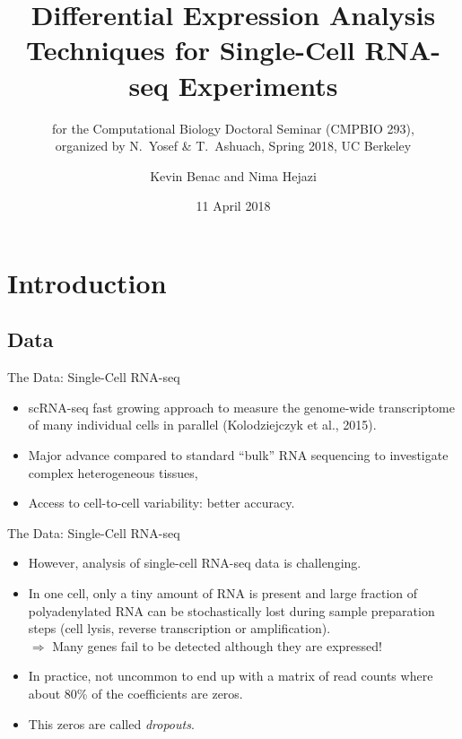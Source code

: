 \documentclass{beamer}
\title[zinbwave-droplasso]{Differential Expression Analysis Techniques for
  Single-Cell RNA-seq Experiments}
\subtitle{\vspace*{0.5em} \scriptsize for the Computational Biology Doctoral
  Seminar (CMPBIO 293),\\ organized by N.~Yosef \& T.~Ashuach, Spring 2018, UC
  Berkeley}
\author{Kevin Benac and Nima Hejazi}
\institute{Group in Biostatistics,\\ University of California, Berkeley}
\date{11 April 2018}
\begin{document}
\begin{frame}
  \titlepage
\end{frame}

\section{Introduction}
\subsection{Data}

\begin{frame}{The Data: Single-Cell RNA-seq}
\begin{itemize}
  \itemsep10pt
  \item scRNA-seq fast growing approach to measure the genome-wide transcriptome
    of many individual cells in parallel (Kolodziejczyk et al., 2015).
  \item Major advance compared to standard “bulk” RNA sequencing to investigate
    complex heterogeneous tissues,
  \item Access to cell-to-cell variability: better accuracy.
\end{itemize}

\end{frame}


\begin{frame}{The Data: Single-Cell RNA-seq}

\begin{itemize}
  \itemsep10pt
  \item However, analysis of single-cell RNA-seq data is challenging.
  \item In one cell, only a tiny amount of RNA is present and large fraction of
    polyadenylated RNA can be stochastically lost during sample preparation
    steps (cell lysis, reverse transcription or amplification). \\
    $\Longrightarrow$ Many genes fail to be detected although they are
    expressed!
  \item In practice, not uncommon to end up with a matrix of read counts where
    about 80\% of the coefficients are zeros.
  \item This zeros are called \textit{dropouts}.
\end{itemize}

\end{frame}
\end{document}
